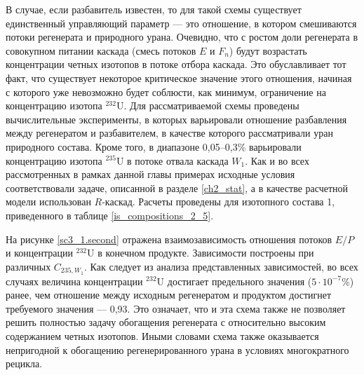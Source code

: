 
В случае, если разбавитель известен, то для такой схемы существует единственный управляющий параметр --- это отношение, в котором смешиваются потоки регенерата и природного урана. Очевидно, что с ростом доли регенерата в совокупном питании каскада (смесь потоков $E$ и $F_n$) будут возрастать концентрации четных изотопов в потоке отбора каскада. Это обуславливает тот факт, что существует некоторое критическое значение этого отношения, начиная с которого уже невозможно будет соблюсти, как минимум, ограничение на концентрацию изотопа $^{232}$U. Для рассматриваемой схемы проведены вычислительные эксперименты, в которых варьировали отношение разбавления между регенератом и разбавителем, в качестве которого рассматривали уран природного состава. Кроме того, в диапазоне 0,05--0,3\% варьировали концентрацию изотопа $^{235}$U в потоке отвала каскада $W_1$. Как и во всех рассмотренных в рамках данной главы примерах исходные условия соответствовали задаче, описанной в разделе \ref{ch2_stat}, а в качестве расчетной модели использован $R$-каскад. Расчеты проведены для изотопного состава 1, приведенного в таблице \ref{is_compositions_2_5}. 

На рисунке \ref{sc3_1.second} отражена взаимозависимость отношения потоков $E/P$ и концентрации $^{232}$U в конечном продукте. Зависимости построены при различных $C_{235, W_1}$. Как следует из анализа представленных зависимостей, во всех случаях величина концентрации  $^{232}$U достигает предельного значения ($5\cdot10^{-7}$\%) ранее, чем отношение между исходным регенератом и продуктом достигнет требуемого значения --- 0,93. Это означает, что и эта схема также не позволяет решить полностью задачу обогащения регенерата с относительно высоким содержанием четных изотопов. Иными словами схема также оказывается непригодной к обогащению регенерированного урана в условиях многократного рецикла.

